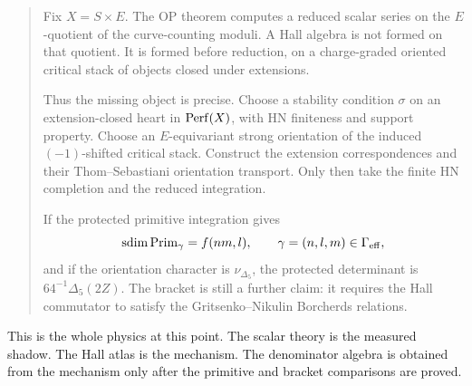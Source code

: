\begin{quote}
Fix \(X=S\times E\).  The OP theorem computes a reduced scalar series on
the \(E\)-quotient of the curve-counting moduli.  A Hall algebra is not
formed on that quotient.  It is formed before reduction, on a
charge-graded oriented critical stack of objects closed under
extensions.

Thus the missing object is precise.  Choose a stability condition
\(\sigma\) on an extension-closed heart in \(\operatorname{Perf}(X)\), with HN
finiteness and support property.  Choose an \(E\)-equivariant strong
orientation of the induced \((-1)\)-shifted critical stack.  Construct
the extension correspondences and their Thom--Sebastiani orientation
transport.  Only then take the finite HN completion and the reduced
integration.

If the protected primitive integration gives
\[
  \operatorname{sdim}\operatorname{Prim}_\gamma=f(nm,l),
  \qquad \gamma=(n,l,m)\in\Gamma_{\mathrm{eff}},
\]
and if the orientation character is \(\nu_{\Delta_5}\), the protected
determinant is \(64^{-1}\Delta_5(2Z)\).  The bracket is still a further
claim: it requires the Hall commutator to satisfy the
Gritsenko--Nikulin Borcherds relations.
\end{quote}

This is the whole physics at this point.  The scalar theory is the
measured shadow.  The Hall atlas is the mechanism.  The denominator
algebra is obtained from the mechanism only after the primitive and
bracket comparisons are proved.
